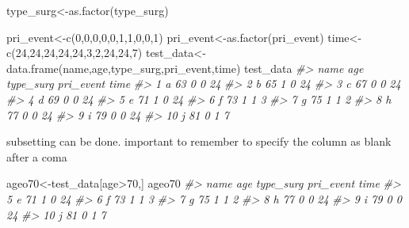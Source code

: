 \documentclass[
]{article}
\newenvironment{Shaded}{\begin{snugshade}}{\end{snugshade}}
\newcommand{\CommentTok}[1]{\textcolor[rgb]{0.56,0.35,0.01}{\textit{#1}}}
\newcommand{\DecValTok}[1]{\textcolor[rgb]{0.00,0.00,0.81}{#1}}
\newcommand{\FunctionTok}[1]{\textcolor[rgb]{0.00,0.00,0.00}{#1}}
\newcommand{\NormalTok}[1]{#1}
\newcommand{\OtherTok}[1]{\textcolor[rgb]{0.56,0.35,0.01}{#1}}
\newcommand{\SpecialCharTok}[1]{\textcolor[rgb]{0.00,0.00,0.00}{#1}}
\begin{document}
\begin{Shaded}
\begin{Highlighting}[]
\NormalTok{type\_surg}\OtherTok{\textless{}{-}}\FunctionTok{as.factor}\NormalTok{(type\_surg)}

\NormalTok{pri\_event}\OtherTok{\textless{}{-}}\FunctionTok{c}\NormalTok{(}\DecValTok{0}\NormalTok{,}\DecValTok{0}\NormalTok{,}\DecValTok{0}\NormalTok{,}\DecValTok{0}\NormalTok{,}\DecValTok{0}\NormalTok{,}\DecValTok{1}\NormalTok{,}\DecValTok{1}\NormalTok{,}\DecValTok{0}\NormalTok{,}\DecValTok{0}\NormalTok{,}\DecValTok{1}\NormalTok{)}
\NormalTok{pri\_event}\OtherTok{\textless{}{-}}\FunctionTok{as.factor}\NormalTok{(pri\_event)}
\NormalTok{time}\OtherTok{\textless{}{-}}\FunctionTok{c}\NormalTok{(}\DecValTok{24}\NormalTok{,}\DecValTok{24}\NormalTok{,}\DecValTok{24}\NormalTok{,}\DecValTok{24}\NormalTok{,}\DecValTok{24}\NormalTok{,}\DecValTok{3}\NormalTok{,}\DecValTok{2}\NormalTok{,}\DecValTok{24}\NormalTok{,}\DecValTok{24}\NormalTok{,}\DecValTok{7}\NormalTok{)}
\NormalTok{test\_data}\OtherTok{\textless{}{-}} \FunctionTok{data.frame}\NormalTok{(name,age,type\_surg,pri\_event,time)}
\NormalTok{test\_data}
\CommentTok{\#\textgreater{}    name age type\_surg pri\_event time}
\CommentTok{\#\textgreater{} 1     a  63         0         0   24}
\CommentTok{\#\textgreater{} 2     b  65         1         0   24}
\CommentTok{\#\textgreater{} 3     c  67         0         0   24}
\CommentTok{\#\textgreater{} 4     d  69         0         0   24}
\CommentTok{\#\textgreater{} 5     e  71         1         0   24}
\CommentTok{\#\textgreater{} 6     f  73         1         1    3}
\CommentTok{\#\textgreater{} 7     g  75         1         1    2}
\CommentTok{\#\textgreater{} 8     h  77         0         0   24}
\CommentTok{\#\textgreater{} 9     i  79         0         0   24}
\CommentTok{\#\textgreater{} 10    j  81         0         1    7}
\end{Highlighting}
\end{Shaded}

subsetting can be done. important to remember to specify the column as blank after a coma

\begin{Shaded}
\begin{Highlighting}[]
\NormalTok{ageo70}\OtherTok{\textless{}{-}}\NormalTok{test\_data[age}\SpecialCharTok{\textgreater{}}\DecValTok{70}\NormalTok{,]}
\NormalTok{ageo70}
\CommentTok{\#\textgreater{}    name age type\_surg pri\_event time}
\CommentTok{\#\textgreater{} 5     e  71         1         0   24}
\CommentTok{\#\textgreater{} 6     f  73         1         1    3}
\CommentTok{\#\textgreater{} 7     g  75         1         1    2}
\CommentTok{\#\textgreater{} 8     h  77         0         0   24}
\CommentTok{\#\textgreater{} 9     i  79         0         0   24}
\CommentTok{\#\textgreater{} 10    j  81         0         1    7}
\end{Highlighting}
\end{Shaded}
\end{document}
